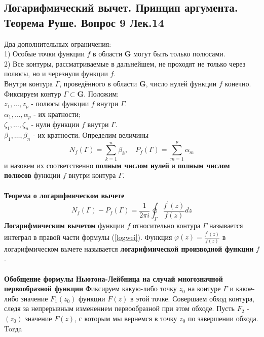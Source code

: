 \documentclass{article}
\begin{document}
\subsection{Логарифмический вычет. Принцип аргумента. Теорема Руше. Вопрос 9 Лек.14}
	Два дополнительных ограничения:\\
	1) Особые точки функции $f$ в области $\mathbf{G}$ могут быть только полюсами.\\
	2) Все контуры, рассматриваемые в дальнейшем, не проходят не только через полюсы, но и черезнули функции $f$.\\
	Внутри контура $\Gamma$, проведённого в области $\mathbf{G}$, число нулей функции $f$ конечно.\\
	Фиксируем контур $\Gamma \subset \mathbf{G}$. Положим:\\
	${z}_{1}, \ldots, {z}_{p}$ - полюсы функции $ f $ внутри $\Gamma$.\\ 
	$\alpha_{1}, \ldots, \alpha_{p}$ - их кратности;\\
	${\zeta}_{1}, \ldots, {\zeta}_{n}$ - нули функции $ f $ внутри $\Gamma$.\\ 
	$\beta_{1}, \ldots, \beta_{n}$ -  их кратности.
	Определим величины
	\begin{equation}
	N_{f}(\Gamma)=\sum_{k=1}^{n} \beta_{k}, \quad P_{f}(\Gamma)=\sum_{m=1}^{p} \alpha_{m}
	\end{equation}
	и назовем их соответственно \textbf{полным числом нулей} и \textbf{полным числом полюсов} функции $ f $ внутри контура $\Gamma$.\\
	\\
	\textbf{Теорема о логарифмическом вычете}
	\begin{equation}
	\label{logwei}
	N_{f}(\Gamma)-P_{f}(\Gamma)=\frac{1}{2 \pi i} \oint_{\Gamma} \frac{f^{\prime}(z)}{f(z)} d z
	\end{equation}
	\textbf{Логарифмическим вычетом} функции $ f $ относительно контура $\Gamma$ называется интеграл в правой части формулы (\ref{logwei}). Функция $ \varphi(z)=\frac{f^{\prime}(z)}{f(z)}$ в логарифмическом вычете называется \textbf{логарифмической производной функции} $f$.\\
	\\
	\textbf{Обобщение формулы Ньютона-Лейбница на случай многозначной первообразной функции} Фиксируем какую-либо точку ${z}_{0}$ на контуре $\Gamma$ и какое-либо значение $ F_{1}\left(z_{0}\right)$ функции $ F(z) $ в этой точке. Совершаем обход контура, следя за непрерывным изменением первообразной при этом обходе. Пусть $ F_{2}$ - $\left(z_{0}\right) $ значение $ F(z)$, с которым мы вернемся в точку $ z_{0} $ по завершении обхода. Torдa
\end{document}
